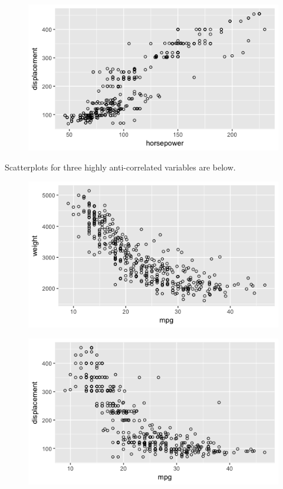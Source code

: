 \begin{enumerate}
\begin{figure}[htbp]
	\end{figure}
	\begin{figure}[htbp]
		\centering
		\includegraphics{img/ESL_02_disp_vs_horsepower.png}
	\end{figure}
	\newpage
	Scatterplots for three highly anti-correlated variables are below.
	\begin{figure}[htbp]
		\centering
		\includegraphics{img/ESL_02_weight_vs_mpg.png}
	\end{figure}
	\begin{figure}[htbp]
		\centering
		\includegraphics{img/ESL_02_disp_vs_mpg.png}

\end{figure}
\end{enumerate}
